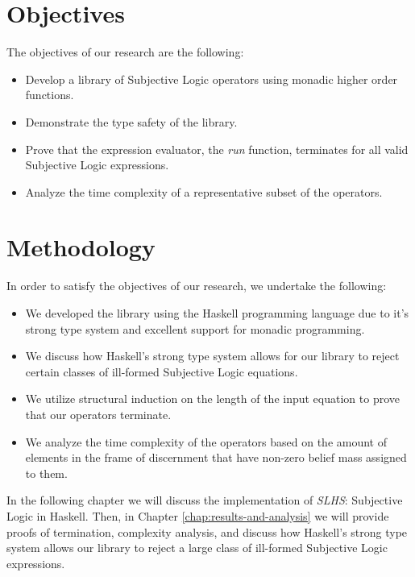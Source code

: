 \documentclass[thesis.tex]{subfiles}
\begin{document}
\section{Objectives}

The objectives of our research are the following:

\begin{itemize}
  \item Develop a library of Subjective Logic operators using monadic higher order functions.
  \item Demonstrate the type safety of the library.
  \item Prove that the expression evaluator, the \emph{run} function, terminates for all valid Subjective Logic expressions.
  \item Analyze the time complexity of a representative subset of the operators.
\end{itemize}




\section{Methodology}

In order to satisfy the objectives of our research, we undertake the following:

\begin{itemize}
  \item We developed the library using the Haskell programming language due to it's strong type
system and excellent support for monadic programming.
  \item We discuss how Haskell's strong type system allows for our library to reject certain
classes of ill-formed Subjective Logic equations.
  \item We utilize structural induction on the length of the input equation to prove that
our operators terminate.
  \item We analyze the time complexity of the operators based on the amount of elements in the
frame of discernment that have non-zero belief mass assigned to them.
\end{itemize}

In the following chapter we will discuss the implementation of \emph{SLHS}: Subjective Logic in Haskell.
Then, in Chapter \ref{chap:results-and-analysis} we will provide proofs of termination, complexity
analysis, and discuss how Haskell's strong type system allows our library to reject a large class of ill-formed
Subjective Logic expressions.
\end{document}
